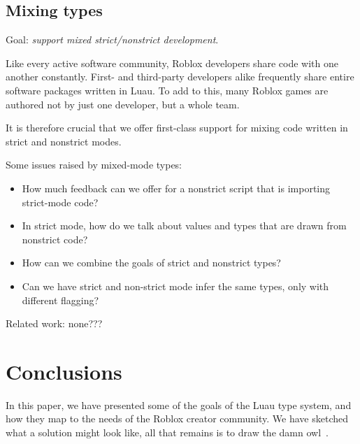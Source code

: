 \documentclass[acmsmall]{acmart}
\begin{document}
\subsection{Mixing types}

Goal: \emph{support mixed strict/nonstrict development}.

Like every active software community, Roblox developers share code
with one another constantly.  First- and third-party developers alike
frequently share entire software packages written in Luau.  To add to
this, many Roblox games are authored not by just one developer, but a
whole team.

It is therefore crucial that we offer first-class support for mixing
code written in strict and nonstrict modes.

Some issues raised by mixed-mode types:
\begin{itemize}

\item How much feedback can we offer for a nonstrict script that is
  importing strict-mode code?

\item In strict mode, how do we talk about values and types that are
  drawn from nonstrict code?

\item How can we combine the goals of strict and nonstrict types?

\item Can we have strict and non-strict mode infer the same types,
  only with different flagging?

\end{itemize}
Related work: none???

\section{Conclusions}

In this paper, we have presented some of the goals of the Luau type
system, and how they map to the needs of the Roblox creator
community. We have sketched what a solution might look like, all that
remains is to draw the damn owl~\cite{owl}.

 
\end{document}
